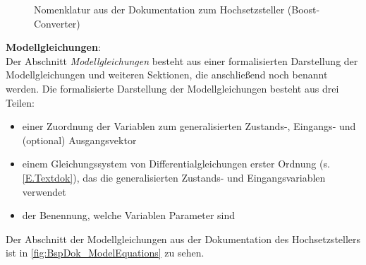 \begin{figure}[H]
	\centering
	\caption[Beispiel zur Nomenklatur der Dokumentation]{Nomenklatur aus der Dokumentation zum Hochsetzsteller (Boost-Converter)}
	\label{fig:BspDok_Nomenclature}
\end{figure}
%
\textbf{Modellgleichungen}:\\
Der Abschnitt \textit{Modellgleichungen} besteht aus einer formalisierten Darstellung der Modellgleichungen und weiteren Sektionen, die anschließend noch benannt werden. Die formalisierte Darstellung der Modellgleichungen besteht aus drei Teilen:  
\begin{itemize}[label=$\bullet$]
	\item einer Zuordnung der Variablen zum generalisierten Zustands-, Eingangs- und (optional) Ausgangsvektor
	\item einem Gleichungssystem von Differentialgleichungen erster Ordnung (s. \ref{E.Textdok}), das die generalisierten Zustands- und Eingangsvariablen verwendet
	\item der Benennung, welche Variablen Parameter sind
\end{itemize} 
Der Abschnitt der Modellgleichungen aus der Dokumentation des Hochsetzstellers ist in \autoref{fig:BspDok_ModelEquations} zu sehen.

